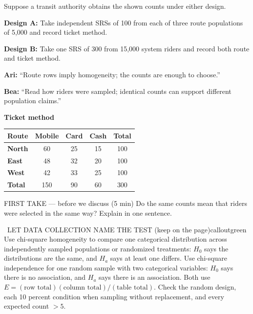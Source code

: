 \documentclass[11pt]{article}
\begin{document}


Suppose a transit authority obtains the shown counts under either design.\par\smallskip \textbf{Design A:} Take independent SRSs of 100 from each of three route populations of 5,000 and record ticket method.\par \textbf{Design B:} Take one SRS of 300 from 15,000 system riders and record both route and ticket method.\par\smallskip \textbf{Ari:} ``Route rows imply homogeneity; the counts are enough to choose.''\par \textbf{Bea:} ``Read how riders were sampled; identical counts can support different population claims.''\par
\begin{center}
\textbf{Ticket method}\par\smallskip
\begin{tabular}{|l|c|c|c|c|}
\hline
\textbf{Route} & \textbf{Mobile} & \textbf{Card} & \textbf{Cash} & \textbf{Total} \\ \hline
\textbf{North} & 60 & 25 & 15 & 100 \\ \hline
\textbf{East} & 48 & 32 & 20 & 100 \\ \hline
\textbf{West} & 42 & 33 & 25 & 100 \\ \hline
\textbf{Total} & 150 & 90 & 60 & 300 \\ \hline
\end{tabular}
\end{center}
\begin{firsttakebox}{FIRST TAKE --- before we discuss (5 min)}
Do the same counts mean that riders were selected in the same way? Explain in one sentence.
\workspace{0.9in}
\end{firsttakebox}

\begin{callout}{\IconBook\ LET DATA COLLECTION NAME THE TEST (keep on the page)}{calloutgreen}
Use chi-square homogeneity to compare one categorical distribution across independently sampled
populations or randomized treatments: $H_0$ says the distributions are the same, and $H_a$ says at least one differs.
Use chi-square independence for one random sample with two categorical variables: $H_0$ says there is no association,
and $H_a$ says there is an association. Both use
$E=(\text{row total})(\text{column total})/(\text{table total})$.
Check the random design, each 10 percent condition when sampling without replacement, and every expected count $>5$.
\end{callout}
\end{document}
